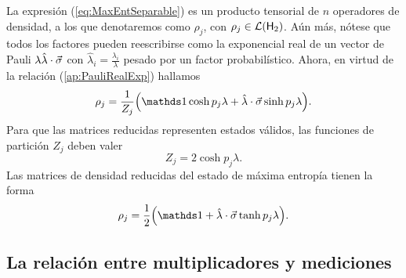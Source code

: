 La expresión (\ref{eq:MaxEntSeparable}) es un producto tensorial de $n$ operadores de densidad, a los que denotaremos como $\rho_{j}$, con $\rho_{j}\in\mathcal{L}({\sf H}_{2})$. Aún más, nótese que todos los factores pueden reescribirse como la exponencial real de un vector de Pauli $\lambda\hat{\lambda}\cdot\vec{\sigma}$ con $\hat{\lambda}_{i}=\frac{\lambda_{i}}{\lambda}$ pesado por un factor probabilístico. Ahora, en virtud de la relación (\ref{ap:PauliRealExp}) hallamos
\begin{equation}
    \rho_{j}=\frac{1}{Z_{j}}\qty(\Id\cosh{p_{j}\lambda}+\paulivec{\lambda}\sinh{p_{j}\lambda}).\nonumber
\end{equation}
Para que las matrices reducidas representen estados válidos, las funciones de partición $Z_{j}$ deben valer
\begin{equation}
    Z_{j}=2\cosh{p_{j}\lambda}.\nonumber
\end{equation}
Las matrices de densidad reducidas del estado de máxima entropía tienen la forma
\begin{equation}\label{eq:rhoArhoB}
    \rho_{j}=\frac{1}{2}\qty(\Id+\paulivec{\lambda}\tanh{p_{j}\lambda}).
\end{equation}

\subsection{La relación entre multiplicadores y mediciones}

